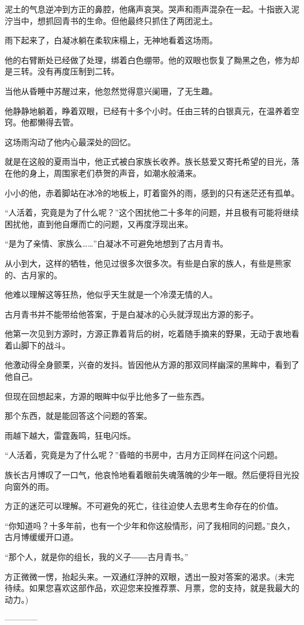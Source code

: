 \begin{this_body}
泥土的气息逆冲到方正的鼻腔，他痛声哀哭。哭声和雨声混杂在一起。十指嵌入泥泞当中，想抓回青书的生命。但他最终只抓住了两团泥土。

雨下起来了，白凝冰躺在柔软床榻上，无神地看着这场雨。

他的右臂断处已经做了处理，绑着白色绷带。他的双眼也恢复了黝黑之色，修为却是三转。没有再度压制到二转。

当他从昏睡中苏醒过来，他忽然觉得意兴阑珊，了无生趣。

他静静地躺着，睁着双眼，已经有十多个小时。任由三转的白银真元，在温养着空窍。他都懒得去管。

这场雨沟动了他内心最深处的回忆。

就是在这般的夏雨当中，他正式被白家族长收养。族长慈爱又寄托希望的目光，落在他的身上，周围家老们恭贺的声音，如潮水般涌来。

小小的他，赤着脚站在冰冷的地板上，盯着窗外的雨，感到的只有迷茫还有孤单。

“人活着，究竟是为了什么呢？”这个困扰他二十多年的问题，并且极有可能将继续困扰他，直到他自爆而亡的问题，又再度浮现出来。

“是为了亲情、家族么……”白凝冰不可避免地想到了古月青书。

从小到大，这样的牺牲，他见过很多次很多次。有些是白家的族人，有些是熊家的、古月家的。

他难以理解这等狂热，他似乎天生就是一个冷漠无情的人。

古月青书并不能带给他答案，于是白凝冰的心头就浮现出方源的影子。

他第一次见到方源时，方源正靠着背后的树，吃着随手摘来的野果，无动于衷地看着山脚下的战斗。

他激动得全身颤栗，兴奋的发抖。皆因他从方源的那双同样幽深的黑眸中，看到了他自己。

但现在回想起来，方源的眼眸中似乎比他多了一些东西。

那个东西，就是能回答这个问题的答案。

雨越下越大，雷霆轰鸣，狂电闪烁。

“人活着，究竟是为了什么呢？”昏暗的书房中，古月方正同样在问这个问题。

族长古月博叹了一口气，他哀怜地看着眼前失魂落魄的少年一眼。然后便将目光投向窗外的雨。

方正的迷茫可以理解。不可避免的死亡，往往迫使人去思考生命存在的价值。

“你知道吗？十多年前，也有一个少年和你这般情形，问了我相同的问题。”良久，古月博缓缓开口道。

“那个人，就是你的组长，我的义子――古月青书。”

方正微微一愣，抬起头来。一双通红浮肿的双眼，透出一股对答案的渴求。(未完待续。如果您喜欢这部作品，欢迎您来投推荐票、月票，您的支持，就是我最大的动力。)

------------

\end{this_body}

